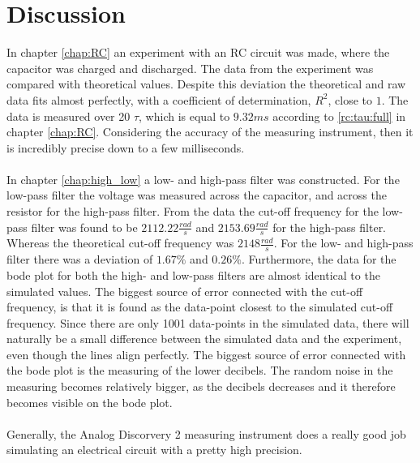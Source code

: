 \chapter{Discussion}
In chapter \ref{chap:RC} an experiment with an RC circuit was made, where the capacitor was charged and discharged. The data from the experiment was compared with theoretical values. Despite this deviation the theoretical and raw data fits almost perfectly, with a coefficient of determination, $R^2$, close to $1$. The data is measured over 20 $\tau$, which is equal to $9.32 ms$ according to \eqref{rc:tau:full} in chapter \ref{chap:RC}. Considering the accuracy of the measuring instrument, then it is incredibly precise down to a few milliseconds. 
\\ \\
In chapter \ref{chap:high_low} a low- and high-pass filter was constructed. For the low-pass filter the voltage was measured across the capacitor, and across the resistor for the high-pass filter. From the data the cut-off frequency for the low-pass filter was found to be $2112.22 \frac{rad}{s}$ and $2153.69 \frac{rad}{s}$ for the high-pass filter. Whereas the theoretical cut-off frequency was $2148 \frac{rad}{s}$. For the low- and high-pass filter there was a deviation of $1.67 \% $ and $0.26 \% $. Furthermore, the data for the bode plot for both the high- and low-pass filters are almost identical to the simulated values. The biggest source of error connected with the cut-off frequency, is that it is found as the data-point closest to the simulated cut-off frequency. Since there are only 1001 data-points in the simulated data, there will naturally be a small difference between the simulated data and the experiment, even though the lines align perfectly. The biggest source of error connected with the bode plot is the measuring of the lower decibels. The random noise in the measuring becomes relatively bigger, as the decibels decreases and it therefore becomes visible on the bode plot.
\\ \\
Generally, the Analog Discorvery 2 measuring instrument does a really good job simulating an electrical circuit with a pretty high precision. 